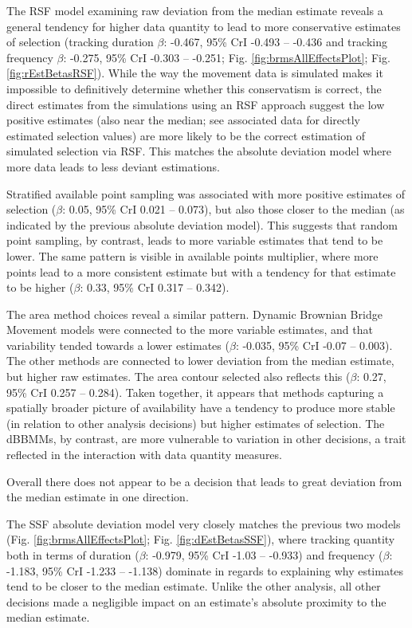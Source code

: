 \documentclass[10pt,a4paper]{article}
\begin{document}
The RSF model examining raw deviation from the median estimate reveals a general tendency for higher data quantity to lead to more conservative estimates of selection (tracking duration \(\beta\): -0.467, 95\% CrI -0.493 -- -0.436 and tracking frequency \(\beta\): -0.275, 95\% CrI -0.303 -- -0.251; Fig. \ref{fig:brmsAllEffectsPlot}; Fig. \ref{fig:rEstBetasRSF}).
While the way the movement data is simulated makes it impossible to definitively determine whether this conservatism is correct, the direct estimates from the simulations using an RSF approach suggest the low positive estimates (also near the median; see associated data for directly estimated selection values) are more likely to be the correct estimation of simulated selection via RSF.
This matches the absolute deviation model where more data leads to less deviant estimations.

Stratified available point sampling was associated with more positive estimates of selection (\(\beta\): 0.05, 95\% CrI 0.021 -- 0.073), but also those closer to the median (as indicated by the previous absolute deviation model).
This suggests that random point sampling, by contrast, leads to more variable estimates that tend to be lower.
The same pattern is visible in available points multiplier, where more points lead to a more consistent estimate but with a tendency for that estimate to be higher (\(\beta\): 0.33, 95\% CrI 0.317 -- 0.342).

The area method choices reveal a similar pattern.
Dynamic Brownian Bridge Movement models were connected to the more variable estimates, and that variability tended towards a lower estimates (\(\beta\): -0.035, 95\% CrI -0.07 -- 0.003).
The other methods are connected to lower deviation from the median estimate, but higher raw estimates.
The area contour selected also reflects this (\(\beta\): 0.27, 95\% CrI 0.257 -- 0.284).
Taken together, it appears that methods capturing a spatially broader picture of availability have a tendency to produce more stable (in relation to other analysis decisions) but higher estimates of selection.
The dBBMMs, by contrast, are more vulnerable to variation in other decisions, a trait reflected in the interaction with data quantity measures.

Overall there does not appear to be a decision that leads to great deviation from the median estimate in one direction.

The SSF absolute deviation model very closely matches the previous two models (Fig. \ref{fig:brmsAllEffectsPlot}; Fig. \ref{fig:dEstBetasSSF}), where tracking quantity both in terms of duration (\(\beta\): -0.979, 95\% CrI -1.03 -- -0.933) and frequency (\(\beta\): -1.183, 95\% CrI -1.233 -- -1.138) dominate in regards to explaining why estimates tend to be closer to the median estimate.
Unlike the other analysis, all other decisions made a negligible impact on an estimate's absolute proximity to the median estimate.
\end{document}
